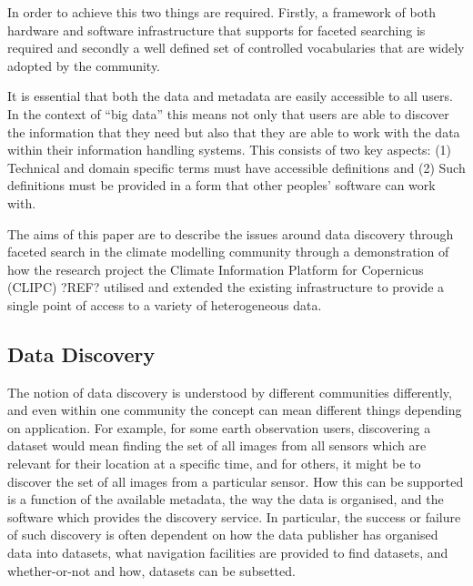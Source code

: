 \documentclass[final,1p,times,twocolumn,authoryear]{elsarticle}
\begin{document}
In order to achieve this two things are required. Firstly, a framework of both hardware and software infrastructure that supports for faceted searching is required and secondly a well defined set of controlled vocabularies that are widely adopted by the community.  

It is essential that both the data and metadata are easily accessible to all users. In the context of “big data” this means not only that users are able to discover the information that they need but also that they are able to work with the data within their information handling systems. This consists of two key aspects: (1) Technical and domain specific terms must have accessible definitions and (2) Such definitions must be provided in a form that other peoples' software can work with. 


The aims of this paper are to describe the issues around data discovery through faceted search in the climate modelling community through a demonstration of how the research project the Climate Information Platform for Copernicus (CLIPC) ?REF? utilised and extended the existing infrastructure to provide a single point of access to a variety of heterogeneous data. 


\subsection{Data Discovery}

The notion of data discovery is understood by different communities differently, and even within one community the concept can mean different things depending on application. 
For example, for some earth observation users, discovering a dataset would mean finding the set of all images from all sensors which are relevant for their location at a specific time, and for others, it might be to discover the set of all images from a particular sensor.
How this can be supported is a function of the available metadata, the way the data is organised, and the software which provides the discovery service. In particular, the success or failure of such discovery is often dependent on how the data publisher has organised data into datasets, what navigation facilities are provided to find datasets, and whether-or-not and how, datasets can be subsetted.
\end{document}
